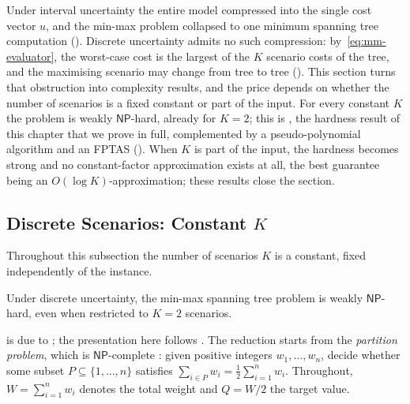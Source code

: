Under interval uncertainty the entire model compressed into the single cost vector $u$, and the min-max problem collapsed to one minimum spanning tree computation ().
Discrete uncertainty admits no such compression: by~\eqref{eq:mm-evaluator}, the worst-case cost is the largest of the $K$ scenario costs of the tree, and the maximising scenario may change from tree to tree ().
This section turns that obstruction into complexity results, and the price depends on whether the number of scenarios is a fixed constant or part of the input.
For every constant $K$ the problem is weakly $\mathsf{NP}$-hard, already for $K = 2$; this is , the hardness result of this chapter that we prove in full, complemented by a pseudo-polynomial algorithm and an FPTAS ().
When $K$ is part of the input, the hardness becomes strong and no constant-factor approximation exists at all, the best guarantee being an $O(\log K)$-approximation; these results close the section.

\subsection{Discrete Scenarios: Constant \texorpdfstring{$K$}{K}}

Throughout this subsection the number of scenarios $K$ is a constant, fixed independently of the instance.

\begin{theorem}\label{thm:mm-k2-hard}
Under discrete uncertainty, the min-max spanning tree problem is weakly $\mathsf{NP}$-hard, even when restricted to $K = 2$ scenarios.
\end{theorem}

 is due to \textcite{KouvelisYu1997}; the presentation here follows \textcite[Theorem~8.4]{Goerigk2021RCO}.
The reduction starts from the \emph{\textcolor{RWTHBlue}{partition problem}}, which is $\mathsf{NP}$-complete \cite[Corollary~15.28]{KorteVygen2018}: given positive integers $w_1, \ldots, w_n$, decide whether some subset $P \subseteq \{1, \ldots, n\}$ satisfies $\sum_{i \in P} w_i = \tfrac{1}{2} \sum_{i=1}^{n} w_i$.
Throughout, $W = \sum_{i=1}^{n} w_i$ denotes the total weight and $Q = W/2$ the target value.

